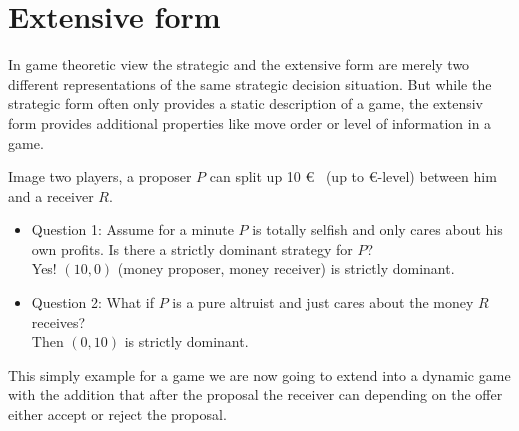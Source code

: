 

\section{Extensive form}

In game theoretic view the strategic and the extensive form are merely two different representations of the same strategic decision situation. But while the strategic form often only provides a static description of a game, the extensiv form provides additional properties like move order or level of information in a game.

\begin{example} 
Image two players, a proposer $P$ can split up 10 \euro ~ (up to \euro-level) between him and a receiver $R$. 
	\begin{itemize}
		\item Question 1: Assume for a minute $P$ is totally selfish and only cares about his own profits. Is there a strictly dominant strategy for $P$? \\
			Yes! $(10, 0)$ (money proposer, money receiver) is strictly dominant.
		\item Question 2: What if $P$ is a pure altruist and just cares about the money $R$ receives? \\
			Then $(0, 10)$ is strictly dominant.
	\end{itemize}
\end{example}

This simply example for a game we are now going to extend into a dynamic game with the addition that after the proposal the receiver can depending on the offer either accept or reject the proposal.

